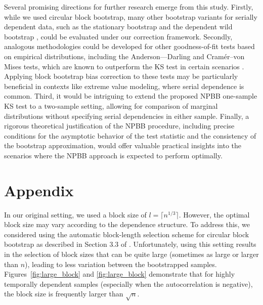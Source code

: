 \documentclass[12pt]{article}
\begin{document}
Several promising directions for further research emerge from
this study. Firstly, while we used circular block bootstrap, many
other bootstrap variants for serially dependent data, such as the
stationary bootstrap \citep{politis1994stationary} and the dependent wild
bootstrap \citep{shao2010dependent}, could be evaluated under our
correction framework. Secondly, analogous methodologies could be
developed for other goodness-of-fit tests based on empirical
distributions, including the Anderson---Darling and Cramér--von
Mises tests, which are known to outperform the KS test in certain scenarios
\citep{stephens2017tests}. Applying block bootstrap bias correction to
these tests may be particularly beneficial in contexts like extreme
value modeling, where serial dependence is common. Third, it would be
intriguing to extend the proposed NPBB
one-sample KS test to a two-sample setting, allowing for comparison of
marginal distributions without specifying serial dependencies in
either sample. Finally, a rigorous theoretical justification of the
NPBB procedure, including precise conditions for the asymptotic
behavior of the test statistic and the consistency of the bootstrap
approximation, would offer valuable practical insights into the
scenarios where the NPBB approach is expected to perform optimally.


\section{Appendix}\label{sec:appendix}
In our original setting, we used a block size of $l = \lceil n^{1/3} \rceil$.
However, the optimal block size may vary according to the dependence structure.
To address this, we considered  using the automatic block-length selection
scheme
for
circular block bootstrap as described in Section 3.3 of
\citet{politis2004automatic}. Unfortunately, using this setting results in
the selection of
block
sizes that can be quite large (sometimes as large or larger than $n$), leading
to less variation between the bootstrapped
samples. Figures~\ref{fig:large_block} and \ref{fig:large_block}
demonstrate that for highly temporally
dependent samples (especially when the autocorrelation is negative),
the block size is frequently larger than $\sqrt{n}$.
\end{document}
